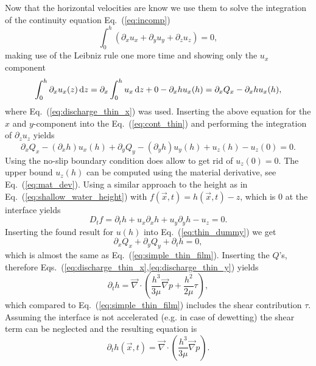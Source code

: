 Now that the horizontal velocities are know we use them to solve the integration of the continuity equation Eq.~(\ref{eq:incomp})
\begin{equation}\label{eq:cont_thin}
    \int_0^h(\partial_x u_x + \partial_y u_y + \partial_z u_z) = 0,
\end{equation}
making use of the Leibniz rule one more time and showing only the $u_x$ component
\begin{equation}
    \int_0^h \partial_x u_x(z) \mathop{}\!\mathrm{d} z = \partial_x\int_0^h u_x\mathop{}\!\mathrm{d} z + 0 - \partial_x h u_x(h) = \partial_x Q_x - \partial_x h u_x(h),  
\end{equation}
where Eq.~(\ref{eq:discharge_thin_x}) was used.
Inserting the above equation for the $x$ and $y$-component into the Eq.~(\ref{eq:cont_thin}) and performing the integration of $\partial_z u_z$ yields
\begin{equation}\label{eq:thin_dummy}
    \partial_x Q_x - (\partial_x h) u_x(h) + \partial_y Q_y - (\partial_y h) u_y(h) + u_z(h) - u_z(0) = 0.
\end{equation}
Using the no-slip boundary condition does allow to get rid of $u_z(0) = 0$.
The upper bound $u_z(h)$ can be computed using the material derivative, see Eq.~(\ref{eq:mat_dev}). 
Using a similar approach to the height as in Eq.~(\ref{eq:shallow_water_height}) with $f(\vec{x},t) = h(\vec{x},t) - z$, which is $0$ at  the interface yields
\begin{equation}\label{eq:mat_uz_h}
    D_t f = \partial_t h + u_x\partial_x h + u_y\partial_y h - u_z = 0.
\end{equation}
Inserting the found result for $u(h)$ into Eq.~(\ref{eq:thin_dummy}) we get
\begin{equation}\label{eq:thin_obsc}
    \partial_x Q_x + \partial_y Q_y + \partial_t h = 0,
\end{equation}
which is almost the same as Eq.~(\ref{eq:simple_thin_film}).
Inserting the $Q$'s, therefore Eqs.~(\ref{eq:discharge_thin_x},\ref{eq:discharge_thin_y}) yields
\begin{equation}
    \partial_t h = \vec{\nabla}\cdot\left(\frac{h^3}{3\mu}\vec{\nabla} p + \frac{h^2}{2\mu}\tau\right),
\end{equation}
which compared to Eq.~(\ref{eq:simple_thin_film}) includes the shear contribution $\tau$.
Assuming the interface is not accelerated (e.g. in case of dewetting) the shear term can be neglected and the resulting equation is 
\begin{equation}\label{eq:thin_final}
    \partial_t h(\vec{x},t) = \vec{\nabla}\cdot\left(\frac{h^3}{3\mu}\vec{\nabla} p\right).
\end{equation}

